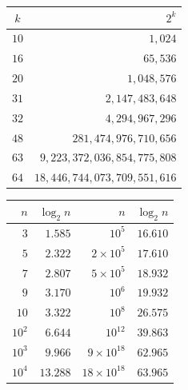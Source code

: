 \begin{center}
    \begin{minipage}[t]{.4\linewidth}
        \vspace{0pt}
        \centering
        \begin{tabular}{|c|r|}
            \hline
            $k$ & $2^k$ \\
            \hline
            $10$ & $1,024$ \\
            \hline
            $16$ & $65,536$ \\
            \hline
            $20$ & $1,048,576$ \\
            \hline
            $31$ & $2,147,483,648$ \\
            \hline
            $32$ & $4,294,967,296$ \\
            \hline
            $48$ & $281,474,976,710,656$ \\
            \hline
            $63$ & $9,223,372,036,854,775,808$ \\
            \hline
            $64$ & $18,446,744,073,709,551,616$ \\
            \hline
        \end{tabular}
    \end{minipage} %
    \begin{minipage}[t]{.4\linewidth}
        \vspace{0pt}
        \centering
        \begin{tabular}{|r|r|r|r|}
            \hline
            $n$ & $\log_2 n$ & $n$ & $\log_2 n$ \\
            \hline
            $3$ & $1.585$ & $10^5$ & $16.610$ \\
            \hline
            $5$ & $2.322$ & $2 \times 10^5$ & $17.610$ \\
            \hline
            $7$ & $2.807$ & $5 \times 10^5$ & $18.932$ \\
            \hline
            $9$ & $3.170$ & $10^6$ & $19.932$ \\
            \hline
            $10$ & $3.322$ & $10^8$ & $26.575$ \\
            \hline
            $10^2$ & $6.644$ & $10^{12}$ & $39.863$ \\
            \hline
            $10^3$ & $9.966$ & $9 \times 10^{18}$ & $62.965$ \\
            \hline
            $10^4$ & $13.288$ & $18 \times 10^{18}$ & $63.965$ \\
            \hline
        \end{tabular}
    \end{minipage}
\end{center}

